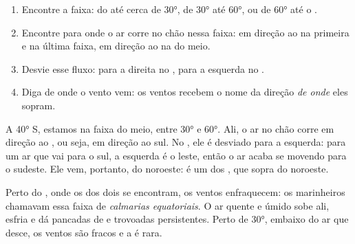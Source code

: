 \begin{method}\label{met:g8:winds-global-circulation:wind}
\begin{enumerate}
  \item Encontre a faixa: do  até cerca de \ang{30}, de \ang{30}
        até \ang{60}, ou de \ang{60} até o .
  \item Encontre para onde o ar corre no chão nessa faixa: em direção ao
         na primeira e na última faixa, em direção ao  na do
        meio.
  \item Desvie esse fluxo: para a direita no , para a
        esquerda no .
  \item Diga de onde o vento vem: os ventos recebem o nome da direção
        \emph{de onde} eles sopram.
\end{enumerate}
\end{method}

\begin{example}\label{ex:g8:winds-global-circulation:40s}
A \ang{40} S, estamos na faixa do meio, entre \ang{30} e \ang{60}. Ali, o
ar no chão corre em direção ao , ou seja, em direção ao sul. No
, ele é desviado para a esquerda: para um ar que vai para o
sul, a esquerda é o leste, então o ar acaba se movendo para o sudeste.
Ele vem, portanto, do noroeste: é um dos , que sopra do
noroeste.
\end{example}

Perto do , onde os  dos dois  se encontram, os
ventos enfraquecem: os marinheiros chamavam essa faixa de
\emph{calmarias equatoriais}. O ar quente e úmido sobe ali, esfria e dá
pancadas de  e trovoadas persistentes. Perto de \ang{30}, embaixo do ar que desce,
os ventos são fracos e a  é rara.

